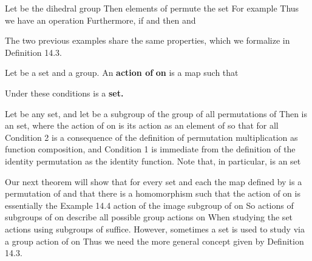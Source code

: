 \documentclass[11pt,oneside]{article}
\begin{document}
\begin{BookBody}
 Let  be the dihedral group  Then elements of  permute the set   For example Thus we have an operation \BookInline{\ast:}  Furthermore, if  and  then  and \BookEnd{\blacktriangle}

\noindent The two previous examples share the same properties, which we formalize in Definition 14.3.

 Let  be a set and  a group. An\textbf{ action of}  \textbf{on}  is a map  such that



Under these conditions is a \textbf{set.} \BookEnd{\blacksquare}

 Let  be any set, and let  be a subgroup of the group  of all permutations of  Then  is an set, where the action of  on  is its action as an element of  so that  for all  Condition 2 is a consequence of the definition of permutation multiplication as function composition, and Condition 1 is immediate from the definition of the identity permutation as the identity function. Note that, in particular,  is an set\BookEnd{\blacktriangle}

Our next theorem will show that for every set  and each  the map  defined by  is a permutation of  and that there is a homomorphism  such that the action of  on  is essentially the Example 14.4 action of the image subgroup  of  on  So actions of subgroups of  on  describe all possible group actions on  When studying the set  actions using subgroups of  suffice. However, sometimes a set  is used to study  via a group action of  on  Thus we need the more general concept given by Definition 14.3.


\end{BookBody}
\end{document}
